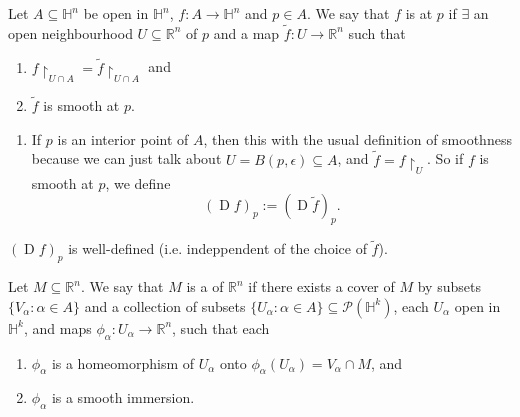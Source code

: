 \documentclass[notoc,notitlepage]{tufte-book}
\DeclareMathOperator{\D}{D}
\begin{document}
\begin{defn}\label{defn:smooth_functions_in_the_half_space}
  Let $A \subseteq \mathbb{H}^n$ be open in $\mathbb{H}^n$, $f : A \to
  \mathbb{H}^n$ and $p \in A$. We say that $f$ is  at $p$ if
  $\exists$ an open neighbourhood $U \subseteq \mathbb{R}^n$ of $p$ and a map
  $\tilde{f} : U \to \mathbb{R}^n$ such that
  \begin{enumerate}
    \item $f \restriction_{U \cap A} = \tilde{f} \restriction_{U \cap A}$ and
    \item $\tilde{f}$ is smooth at $p$.
  \end{enumerate}
\end{defn}

\begin{remark}
  \begin{enumerate}
    \item If $p$ is an interior point of $A$, then this  with
      the usual definition of smoothness because we can just talk about $U =
      B(p, \epsilon) \subseteq A$, and $\tilde{f} = f \restriction_{U}$. So if
      $f$ is smooth at $p$, we define
      \begin{equation*}
        (\D f)_p := (\D \tilde{f})_p.
      \end{equation*}
  \end{enumerate}
\end{remark}

 $(\D f)_p$ is well-defined (i.e. indeppendent of the choice of
$\tilde{f}$).

\begin{defn}\label{defn:submanifold_with_boundary}
  Let $M \subseteq \mathbb{R}^n$. We say that $M$ is a  of $\mathbb{R}^n$ if there exists a cover of $M$ by
  subsets $\{ V_\alpha : \alpha \in A \}$ and a collection of subsets $\{
  U_\alpha : \alpha \in A \} \subseteq \mathcal{P}(\mathbb{H}^k)$, each
  $U_\alpha$ open in $\mathbb{H}^k$, and maps $\phi_\alpha : U_\alpha \to
  \mathbb{R}^n$, such that each
  \begin{enumerate}
    \item $\phi_\alpha$ is a homeomorphism of $U_\alpha$ onto
      $\phi_\alpha(U_\alpha) = V_\alpha \cap M$, and
    \item $\phi_\alpha$ is a smooth immersion.
  \end{enumerate}
\end{defn}
\end{document}
